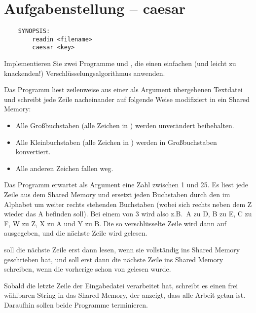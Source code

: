 




\section*{Aufgabenstellung -- caesar}

\begin{verbatim}
    SYNOPSIS:
        readin <filename>
        caesar <key>
\end{verbatim}

Implementieren Sie zwei Programme  und , die
einen einfachen (und leicht zu knackenden!) Verschlüsselungsalgorithmus
anwenden.

Das Programm  liest zeilenweise aus einer als Argument
übergebenen Textdatei und schreibt jede Zeile nacheinander auf folgende Weise
modifiziert in ein Shared Memory:

\begin{itemize}
\item Alle Großbuchstaben (alle Zeichen in \osueregex{[A-Z]}) werden
unverändert beibehalten.
\item Alle Kleinbuchstaben (alle Zeichen in \osueregex{[a-z]}) werden in
Großbuchstaben konvertiert.
\item Alle anderen Zeichen fallen weg.
\end{itemize}

Das Programm  erwartet als Argument eine Zahl zwischen 1
und 25. Es liest jede Zeile aus dem Shared Memory und ersetzt jeden
Buchstaben durch den im Alphabet um  weiter rechts stehenden
Buchstaben (wobei sich rechts neben dem Z wieder das A befinden
soll). Bei einem  von 3 wird also z.B.\ A zu D, B zu E, C zu
F, W zu Z, X zu A und Y zu B. Die so verschlüsselte Zeile wird dann
auf  ausgegeben, und die nächste Zeile wird gelesen.

 soll die nächste Zeile erst dann lesen, wenn 
sie vollständig ins Shared Memory geschrieben hat, und  soll
erst dann die nächste Zeile ins Shared Memory schreiben, wenn die vorherige
schon von  gelesen wurde.

Sobald  die letzte Zeile der Eingabedatei verarbeitet hat,
schreibt es einen frei wählbaren String in das Shared Memory, der
 anzeigt, dass alle Arbeit getan ist. Daraufhin sollen beide
Programme terminieren.

